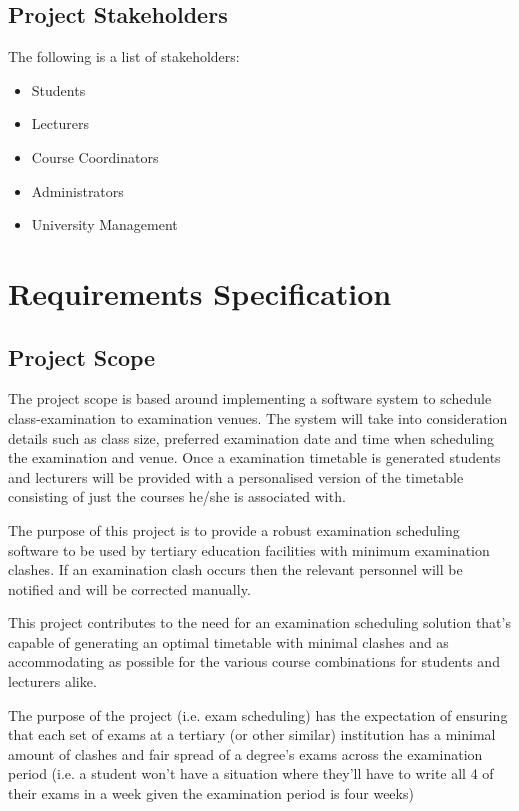 \documentclass{article}
\begin{document}
\subsection{Project Stakeholders}
The following is a list of stakeholders:
\begin{itemize}
\item Students
\item Lecturers
\item Course Coordinators
\item Administrators
\item University Management
\end{itemize}

\section{Requirements Specification}
\subsection{Project Scope}

The project scope is based around implementing a software system to schedule class-examination to examination venues. The system will take into consideration details such as class size, preferred examination date and time when scheduling the examination and venue. Once a examination timetable is generated students and lecturers will be provided with a personalised version of the timetable consisting of just the courses he/she is associated with. 

The purpose of this project is to provide a robust examination scheduling software to be used by tertiary education facilities with minimum examination clashes. If an examination clash occurs then the relevant personnel will be notified and will be corrected manually.

This project contributes to the need for an examination scheduling solution that's capable of generating an optimal timetable with minimal clashes and as accommodating as possible for the various course combinations for students and lecturers alike.

The purpose of the project (i.e. exam scheduling) has the expectation of ensuring that each set of exams at a tertiary (or other similar) institution has a minimal amount of clashes and fair spread of a degree's exams across the examination period (i.e. a student won't have a situation where they'll have to write all 4 of their exams in a week given the examination period is four weeks)
\end{document}
